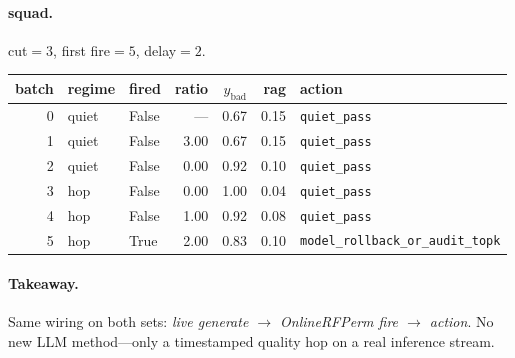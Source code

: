 \documentclass[11pt]{article}
\begin{document}
\paragraph{squad.} cut$=3$, first fire$=5$, delay$=2$.
\begin{center}\small
\begin{tabular}{rllrrrl}
\toprule batch & regime & fired & ratio & $y_{\mathrm{bad}}$ & rag & action \\ \midrule
0 & quiet & False & --- & 0.67 & 0.15 & \texttt{quiet\_pass} \\
1 & quiet & False & 3.00 & 0.67 & 0.15 & \texttt{quiet\_pass} \\
2 & quiet & False & 0.00 & 0.92 & 0.10 & \texttt{quiet\_pass} \\
3 & hop & False & 0.00 & 1.00 & 0.04 & \texttt{quiet\_pass} \\
4 & hop & False & 1.00 & 0.92 & 0.08 & \texttt{quiet\_pass} \\
5 & hop & True & 2.00 & 0.83 & 0.10 & \texttt{model\_rollback\_or\_audit\_topk} \\
\bottomrule\end{tabular}\end{center}

\paragraph{Takeaway.}
Same wiring on both sets: \emph{live generate $\to$ OnlineRFPerm fire $\to$ action}. No new LLM method---only a timestamped quality hop on a real inference stream.
\end{document}
